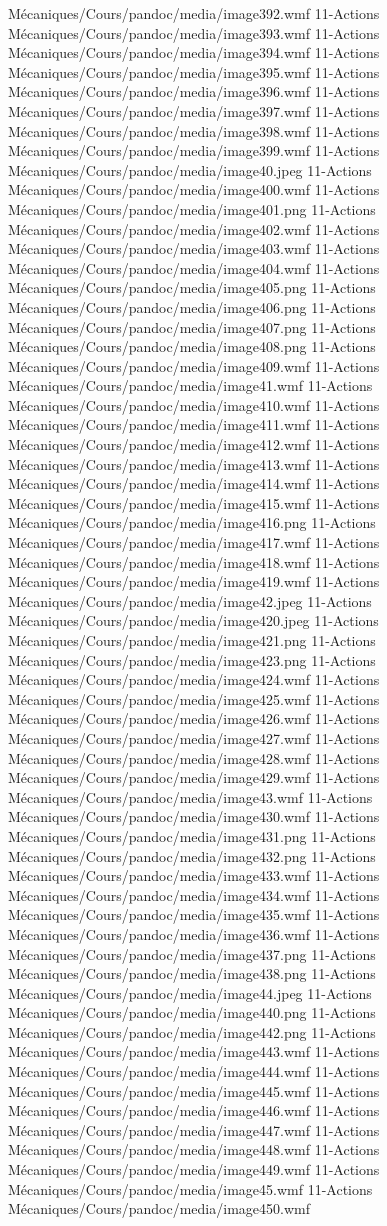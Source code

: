Mécaniques/Cours/pandoc/media/image392.wmf 11-Actions Mécaniques/Cours/pandoc/media/image393.wmf 11-Actions Mécaniques/Cours/pandoc/media/image394.wmf 11-Actions Mécaniques/Cours/pandoc/media/image395.wmf 11-Actions Mécaniques/Cours/pandoc/media/image396.wmf 11-Actions Mécaniques/Cours/pandoc/media/image397.wmf 11-Actions Mécaniques/Cours/pandoc/media/image398.wmf 11-Actions Mécaniques/Cours/pandoc/media/image399.wmf 11-Actions Mécaniques/Cours/pandoc/media/image40.jpeg 11-Actions Mécaniques/Cours/pandoc/media/image400.wmf 11-Actions Mécaniques/Cours/pandoc/media/image401.png 11-Actions Mécaniques/Cours/pandoc/media/image402.wmf 11-Actions Mécaniques/Cours/pandoc/media/image403.wmf 11-Actions Mécaniques/Cours/pandoc/media/image404.wmf 11-Actions Mécaniques/Cours/pandoc/media/image405.png 11-Actions Mécaniques/Cours/pandoc/media/image406.png 11-Actions Mécaniques/Cours/pandoc/media/image407.png 11-Actions Mécaniques/Cours/pandoc/media/image408.png 11-Actions Mécaniques/Cours/pandoc/media/image409.wmf 11-Actions Mécaniques/Cours/pandoc/media/image41.wmf 11-Actions Mécaniques/Cours/pandoc/media/image410.wmf 11-Actions Mécaniques/Cours/pandoc/media/image411.wmf 11-Actions Mécaniques/Cours/pandoc/media/image412.wmf 11-Actions Mécaniques/Cours/pandoc/media/image413.wmf 11-Actions Mécaniques/Cours/pandoc/media/image414.wmf 11-Actions Mécaniques/Cours/pandoc/media/image415.wmf 11-Actions Mécaniques/Cours/pandoc/media/image416.png 11-Actions Mécaniques/Cours/pandoc/media/image417.wmf 11-Actions Mécaniques/Cours/pandoc/media/image418.wmf 11-Actions Mécaniques/Cours/pandoc/media/image419.wmf 11-Actions Mécaniques/Cours/pandoc/media/image42.jpeg 11-Actions Mécaniques/Cours/pandoc/media/image420.jpeg 11-Actions Mécaniques/Cours/pandoc/media/image421.png 11-Actions Mécaniques/Cours/pandoc/media/image423.png 11-Actions Mécaniques/Cours/pandoc/media/image424.wmf 11-Actions Mécaniques/Cours/pandoc/media/image425.wmf 11-Actions Mécaniques/Cours/pandoc/media/image426.wmf 11-Actions Mécaniques/Cours/pandoc/media/image427.wmf 11-Actions Mécaniques/Cours/pandoc/media/image428.wmf 11-Actions Mécaniques/Cours/pandoc/media/image429.wmf 11-Actions Mécaniques/Cours/pandoc/media/image43.wmf 11-Actions Mécaniques/Cours/pandoc/media/image430.wmf 11-Actions Mécaniques/Cours/pandoc/media/image431.png 11-Actions Mécaniques/Cours/pandoc/media/image432.png 11-Actions Mécaniques/Cours/pandoc/media/image433.wmf 11-Actions Mécaniques/Cours/pandoc/media/image434.wmf 11-Actions Mécaniques/Cours/pandoc/media/image435.wmf 11-Actions Mécaniques/Cours/pandoc/media/image436.wmf 11-Actions Mécaniques/Cours/pandoc/media/image437.png 11-Actions Mécaniques/Cours/pandoc/media/image438.png 11-Actions Mécaniques/Cours/pandoc/media/image44.jpeg 11-Actions Mécaniques/Cours/pandoc/media/image440.png 11-Actions Mécaniques/Cours/pandoc/media/image442.png 11-Actions Mécaniques/Cours/pandoc/media/image443.wmf 11-Actions Mécaniques/Cours/pandoc/media/image444.wmf 11-Actions Mécaniques/Cours/pandoc/media/image445.wmf 11-Actions Mécaniques/Cours/pandoc/media/image446.wmf 11-Actions Mécaniques/Cours/pandoc/media/image447.wmf 11-Actions Mécaniques/Cours/pandoc/media/image448.wmf 11-Actions Mécaniques/Cours/pandoc/media/image449.wmf 11-Actions Mécaniques/Cours/pandoc/media/image45.wmf 11-Actions Mécaniques/Cours/pandoc/media/image450.wmf 